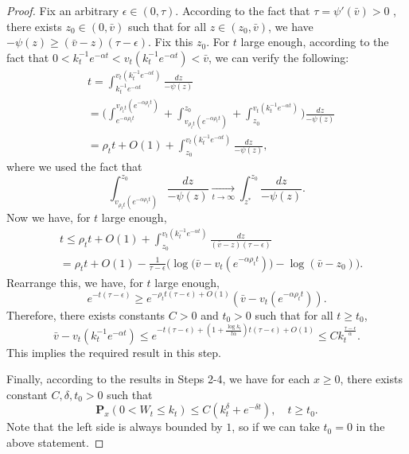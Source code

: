 \documentclass[12pt,a4paper]{amsart}
\theoremstyle{plain}
\theoremstyle{definition}
\numberwithin{equation}{section}
\begin{document}
\begin{proof}
    Fix an arbitrary $\epsilon \in (0,\tau)$.
    According to the fact that $\tau=\psi'(\bar v)>0$ , there exists $z_0 \in (0,\bar v)$ such that for all $z\in (z_0, \bar v)$, we have $-\psi(z)\geq (\bar v - z)(\tau- \epsilon)$.
    Fix this $z_0$. For $t$ large enough, according to the fact that $0<k_t^{-1}e^{-\alpha t} < v_t(k_t^{-1}e^{-\alpha t})< \bar v$, we can verify the following:
\begin{equation}\begin{split}
    &t =\int^{v_t(k_t^{-1} e^{-\alpha t})}_{k_t^{-1} e^{-\alpha t}}\frac{dz}{-\psi(z)}
    \\&= \Big(\int^{v_{\rho_t t}(e^{-\alpha \rho_t t})}_{e^{-\alpha \rho_t t}}  + \int^{z_0}_{v_{\rho_t t}(e^{-\alpha \rho_t t})} +\int^{v_t(k_t^{-1}e^{-\alpha  t})}_{z_0}\Big)\frac{dz}{-\psi(z)}
     \\&= \rho_t t + O(1) +\int^{v_t(k_t^{-1}e^{-\alpha t})}_{z_0} \frac{dz}{-\psi(z)},
\end{split}\end{equation} 
    where we used the fact that
\[
    \int_{v_{\rho_t t}(e^{-\alpha \rho_tt})}^{z_0} \frac{dz}{-\psi(z)} \xrightarrow[t\to \infty] {}\int_{z^*}^{z_0} \frac{dz}{-\psi(z)}.
\]
    Now we have, for $t$ large enough,
\begin{equation}\begin{split}
    &t\leq  \rho_t t + O(1)+ \int_{z_0}^{v_t(k_t^{-1}e^{-\alpha t})} \frac{dz}{(\bar v-z)(\tau - \epsilon)}
    \\&=  \rho_t t +O(1)- \frac{1}{\tau-\epsilon}\Big( \log \big(\bar v-v_t(e^{-\alpha \rho_t t})\big) - \log(\bar v-z_0)\Big).
\end{split}\end{equation}
    Rearrange this, we have, for $t$ large enough,
\[
    e^{-t(\tau - \epsilon)} \geq e^{-\rho_t t(\tau - \epsilon)+O(1)}(\bar v - v_t(e^{-\alpha \rho_t t})).
\]
    Therefore, there exists constants $C>0$ and $t_0>0$ such that for all $t\geq t_0$, 
\[
    \bar v - v_t(k_t^{-1} e^{-\alpha t}) \leq e^{-t(\tau -\epsilon)+ (1+\frac{\log k_t}{t\alpha})t(\tau - \epsilon)+O(1)}
    \leq Ck_t^{\frac{\tau - \epsilon}{\alpha}}.
\]
    This implies the required result in this step.

    Finally, according to the results in Steps 2-4, we have for each $x\geq 0$, there exists constant $C, \delta, t_0 > 0$ such that
\[
    \mathbf P_{x}(0< W_t\leq k_t) \leq C(k_t^{\delta}+e^{-\delta t}),\quad t\geq t_0.
\]
Note that the left side is always bounded by $1$, so if we can take $t_0 =0$ in the above statement. 
\end{proof}
\begin{comment}


\end{comment}
\end{document}
